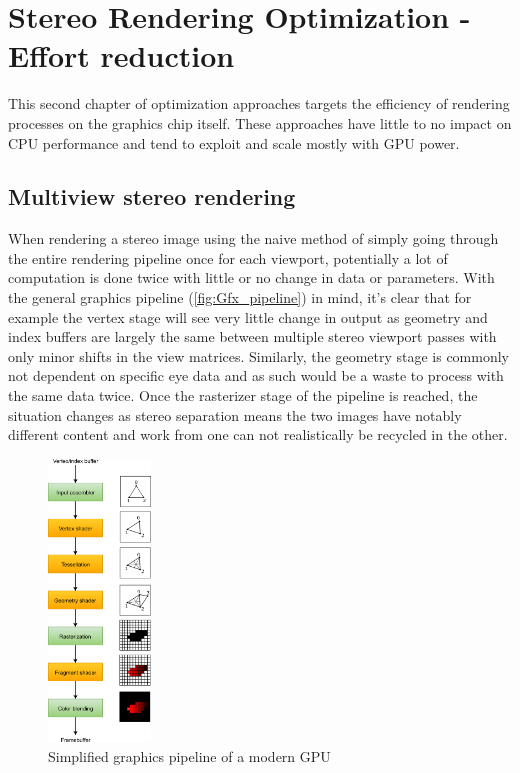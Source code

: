 
\chapter{Stereo Rendering Optimization - Effort reduction}
This second chapter of optimization approaches targets the efficiency of rendering processes on the graphics chip itself. These approaches have little to no impact on CPU performance and tend to exploit and scale mostly with GPU power. 

\section{Multiview stereo rendering}
When rendering a stereo image using the naive method of simply going through the entire rendering pipeline once for each viewport, potentially a lot of computation is done twice with little or no change in data or parameters. 
With the general graphics pipeline (\autoref{fig:Gfx_pipeline}) in mind, it's clear that for example the vertex stage will see very little change in output as geometry and index buffers are largely the same between multiple stereo viewport passes with only minor shifts in the view matrices. Similarly, the geometry stage is commonly not dependent on specific eye data and as such would be a waste to process with the same data twice. Once the rasterizer stage of the pipeline is reached, the situation changes as stereo separation means the two images have notably different content and work from one can not realistically be recycled in the other. 

\begin{figure}[htb]
  \centering
  \includegraphics[height=7.5cm]{pictures/vulkan_simplified_pipeline}
  \caption{Simplified graphics pipeline of a modern GPU\cite{Overvoorde.}} \label{fig:Gfx_pipeline}
\end{figure}

